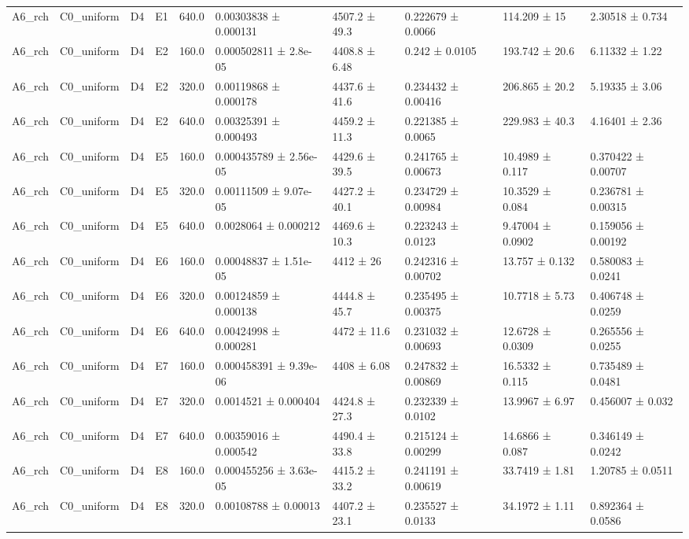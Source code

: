 \begin{table}
\begin{tabular}{llllllllll}
A6\_rch & C0\_uniform & D4 & E1 & 640.0 & 0.00303838 ± 0.000131 & 4507.2 ± 49.3 & 0.222679 ± 0.0066 & 114.209 ± 15 & 2.30518 ± 0.734 \\
A6\_rch & C0\_uniform & D4 & E2 & 160.0 & 0.000502811 ± 2.8e-05 & 4408.8 ± 6.48 & 0.242 ± 0.0105 & 193.742 ± 20.6 & 6.11332 ± 1.22 \\
A6\_rch & C0\_uniform & D4 & E2 & 320.0 & 0.00119868 ± 0.000178 & 4437.6 ± 41.6 & 0.234432 ± 0.00416 & 206.865 ± 20.2 & 5.19335 ± 3.06 \\
A6\_rch & C0\_uniform & D4 & E2 & 640.0 & 0.00325391 ± 0.000493 & 4459.2 ± 11.3 & 0.221385 ± 0.0065 & 229.983 ± 40.3 & 4.16401 ± 2.36 \\
A6\_rch & C0\_uniform & D4 & E5 & 160.0 & 0.000435789 ± 2.56e-05 & 4429.6 ± 39.5 & 0.241765 ± 0.00673 & 10.4989 ± 0.117 & 0.370422 ± 0.00707 \\
A6\_rch & C0\_uniform & D4 & E5 & 320.0 & 0.00111509 ± 9.07e-05 & 4427.2 ± 40.1 & 0.234729 ± 0.00984 & 10.3529 ± 0.084 & 0.236781 ± 0.00315 \\
A6\_rch & C0\_uniform & D4 & E5 & 640.0 & 0.0028064 ± 0.000212 & 4469.6 ± 10.3 & 0.223243 ± 0.0123 & 9.47004 ± 0.0902 & 0.159056 ± 0.00192 \\
A6\_rch & C0\_uniform & D4 & E6 & 160.0 & 0.00048837 ± 1.51e-05 & 4412 ± 26 & 0.242316 ± 0.00702 & 13.757 ± 0.132 & 0.580083 ± 0.0241 \\
A6\_rch & C0\_uniform & D4 & E6 & 320.0 & 0.00124859 ± 0.000138 & 4444.8 ± 45.7 & 0.235495 ± 0.00375 & 10.7718 ± 5.73 & 0.406748 ± 0.0259 \\
A6\_rch & C0\_uniform & D4 & E6 & 640.0 & 0.00424998 ± 0.000281 & 4472 ± 11.6 & 0.231032 ± 0.00693 & 12.6728 ± 0.0309 & 0.265556 ± 0.0255 \\
A6\_rch & C0\_uniform & D4 & E7 & 160.0 & 0.000458391 ± 9.39e-06 & 4408 ± 6.08 & 0.247832 ± 0.00869 & 16.5332 ± 0.115 & 0.735489 ± 0.0481 \\
A6\_rch & C0\_uniform & D4 & E7 & 320.0 & 0.0014521 ± 0.000404 & 4424.8 ± 27.3 & 0.232339 ± 0.0102 & 13.9967 ± 6.97 & 0.456007 ± 0.032 \\
A6\_rch & C0\_uniform & D4 & E7 & 640.0 & 0.00359016 ± 0.000542 & 4490.4 ± 33.8 & 0.215124 ± 0.00299 & 14.6866 ± 0.087 & 0.346149 ± 0.0242 \\
A6\_rch & C0\_uniform & D4 & E8 & 160.0 & 0.000455256 ± 3.63e-05 & 4415.2 ± 33.2 & 0.241191 ± 0.00619 & 33.7419 ± 1.81 & 1.20785 ± 0.0511 \\
A6\_rch & C0\_uniform & D4 & E8 & 320.0 & 0.00108788 ± 0.00013 & 4407.2 ± 23.1 & 0.235527 ± 0.0133 & 34.1972 ± 1.11 & 0.892364 ± 0.0586 \\

\end{tabular}
\end{table}
